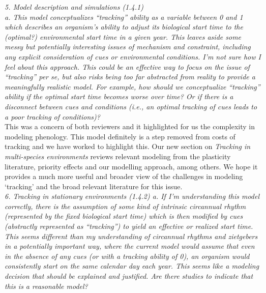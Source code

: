 \documentclass[11pt]{article}
\begin{document}
\emph{5.      Model description and simulations (1.4.1)\\
a.      This model conceptualizes ``tracking'' ability as a variable between 0 and 1 which
describes an organism's ability to adjust its biological start time to the (optimal?)
environmental start time in a given year. This leaves aside some messy but potentially
interesting issues of mechanism and constraint, including any explicit consideration of cues
or environmental conditions. I'm not sure how I feel about this approach. This could be an
effective way to focus on the issue of ``tracking'' per se, but also risks being too far
abstracted from reality to provide a meaningfully realistic model. For example, how should we
conceptualize ``tracking'' ability if the optimal start time becomes worse over time? Or if
there is a disconnect between cues and conditions (i.e., an optimal tracking of cues leads to
a poor tracking of conditions)?}\\

This was a concern of both reviewers and it highlighted for us the complexity in modeling phenology. This model definitely is a step removed from costs of tracking and we have worked to highlight this. Our new section on \emph{Tracking in multi-species environments} reviews relevant modeling from the plasticity literature, priority effects and our modelling approach, among others. We hope it provides a much more useful and broader view of the challenges in modeling `tracking' and the broad relevant literature for this issue. \\ 

\emph{6.      Tracking in stationary environments (1.4.2)
a.      If I'm understanding this model correctly, there is the assumption of some kind of
intrinsic circannual rhythm (represented by the fixed biological start time) which is then
modified by cues (abstractly represented as ``tracking'') to yield an effective or realized start time. This seems different than my understanding of circannual rhythms and zietgebers %
in a potentially important way, where the current model would assume that even in the absence
of any cues (or with a tracking ability of 0), an organism would consistently start on the
same calendar day each year. This seems like a modeling decision that should be explained and
justified. Are there studies to indicate that this is a reasonable model?}\\
\end{document}
